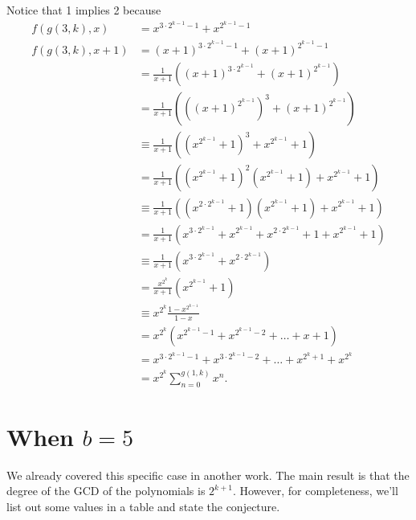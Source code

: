 \documentclass{article}
\begin{document}
	Notice that 1 implies 2 because
	\begin{align*}
		f(g(3,k),x) &= x^{3\cdot2^{k-1}-1} + x^{2^{k-1}-1} \\
		f(g(3,k),x+1) &= (x+1)^{3\cdot2^{k-1}-1} + (x+1)^{2^{k-1}-1} \\
		&= \frac{1}{x+1}\left((x+1)^{3\cdot2^{k-1}} + (x+1)^{2^{k-1}}\right) \\
		&= \frac{1}{x+1}\left(\left((x+1)^{2^{k-1}}\right)^3 + (x+1)^{2^{k-1}}\right) \\
		&\equiv \frac{1}{x+1}\left(\left(x^{2^{k-1}}+1\right)^3 + x^{2^{k-1}} + 1\right) \\
		&= \frac{1}{x+1}\left(\left(x^{2^{k-1}}+1\right)^2\left(x^{2^{k-1}}+1\right) + x^{2^{k-1}} + 1\right) \\
		&\equiv \frac{1}{x+1}\left(\left(x^{2\cdot2^{k-1}}+1\right)\left(x^{2^{k-1}}+1\right) + x^{2^{k-1}} + 1\right) \\
		&= \frac{1}{x+1}\left(x^{3\cdot2^{k-1}} + x^{2^{k-1}} + x^{2\cdot2^{k-1}} + 1 + x^{2^{k-1}} + 1\right) \\
		&\equiv \frac{1}{x+1}\left(x^{3\cdot2^{k-1}} + x^{2\cdot2^{k-1}}\right) \\
		&= \frac{x^{2^{k}}}{x+1}\left(x^{2^{k-1}} + 1\right) \\
		&\equiv x^{2^{k}}\frac{1-x^{2^{k-1}}}{1-x} \\
		&= x^{2^{k}}\left(x^{2^{k-1}-1}+x^{2^{k-1}-2}+\dots+x+1\right) \\
		&= x^{3\cdot2^{k-1}-1} + x^{3\cdot2^{k-1}-2} + \dots + x^{2^k + 1} + x^{2^k} \\
		&= x^{2^k}\sum_{n=0}^{g(1,k)}{x^n}.
	\end{align*}


	\newpage
	\section{When $b = 5$}
	We already covered this specific case in another work.
	The main result is that the degree of the GCD of the polynomials is $2^{k+1}$.
	However, for completeness, we'll list out some values in a table and state the conjecture.
	
\end{document}
